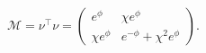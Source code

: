 \begin{equation}
\mathcal{M=}\nu ^{\intercal }\nu =\left(
\begin{array}{cc}
e^{\phi } & \chi e^{\phi } \\
\chi e^{\phi } & e^{-\phi }+\chi ^{2}e^{\phi }
\end{array}
\right) .
\end{equation}

